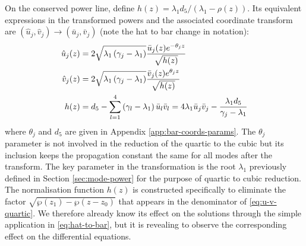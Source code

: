 \documentclass[11pt,a4paper]{article}
\numberwithin{equation}{section}
\begin{document}
On the conserved power line, define $h(z)=\lambda_1d_5/(\lambda_1-\rho(z))$.
Its equivalent expressions in the transformed powers and the associated coordinate transform are $\left(\hat{u}_j, \hat{v}_j\right) \rightarrow \left(\bar{u}_j, \bar{v}_j \right)$ (note the hat to bar change in notation):
\begin{align}
\hat{u}_j(z) &= 2 \sqrt{{\lambda}_{1} \left({\gamma}_{j} - {\lambda}_{1}\right)} \frac{\bar{u}_j(z) e^{-\theta_j z}}{\sqrt{h{\left(z \right)}}} \notag \\
\hat{v}_j(z) &= 2 \sqrt{{\lambda}_{1} \left({\gamma}_{j} - {\lambda}_{1}\right)}  \frac{\bar{v}_j(z) e^{\theta_j z} }{\sqrt{h{\left(z \right)}}} \notag \\
h{\left(z \right)} &= {d}_{5} - \sum_{l=1}^{4} \left({\gamma}_{l} - {\lambda}_{1}\right) \bar{u}_l \bar{v}_l = 4 {\lambda}_{1} \bar{u}_j \bar{v}_j - \frac{{\lambda}_{1}{d}_{5} }{{\gamma}_{j} - {\lambda}_{1}} \label{eq:hat-to-bar}
\end{align}
where $\theta_j$ and $d_5$ are given in Appendix \ref{app:bar-coords-params}.
The $\theta_j$ parameter is not involved in the reduction of the quartic to the cubic but its inclusion keeps the propagation constant the same for all modes after the transform.
The key parameter in the transformation is the root $\lambda_1$ previously defined in Section \ref{sec:mode-power} for the purpose of quartic to cubic reduction.
The normalisation function $h(z)$ is constructed specifically to eliminate the factor $\sqrt{\wp(z_1) - \wp(z - z_0)}$ that appears in the denominator of \eqref{eq:u-v-quartic}.
We therefore already know its effect on the solutions through the simple application in \eqref{eq:hat-to-bar}, but it is revealing to observe the corresponding effect on the differential equations.
\end{document}
